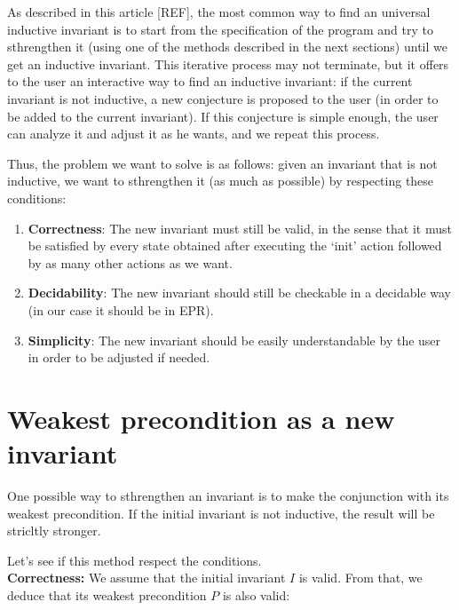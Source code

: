 \documentclass[11pt,a4paper,oldfontcommands]{memoir}
\begin{document}
    As described in this article [REF], the most common way to find an universal inductive invariant is to start from the specification of the program
    and try to sthrengthen it (using one of the methods described in the next sections) until we get an inductive invariant.
    This iterative process may not terminate, but it offers to the user an interactive way to find an inductive invariant:
    if the current invariant is not inductive, a new conjecture is proposed to the user (in order to be added to the current invariant).
    If this conjecture is simple enough, the user can analyze it and adjust it as he wants, and we repeat this process.

    Thus, the problem we want to solve is as follows:
    given an invariant that is not inductive, we want to sthrengthen it (as much as possible) by respecting these conditions:
    \begin{enumerate}
        \item \textbf{Correctness}: The new invariant must still be valid, in the sense that it must be satisfied by every state obtained
        after executing the `init' action followed by as many other actions as we want.
        \item \textbf{Decidability}: The new invariant should still be checkable in a decidable way (in our case it should be in EPR).
        \item \textbf{Simplicity}: The new invariant should be easily understandable by the user in order to be adjusted if needed.
    \end{enumerate}

    \section{Weakest precondition as a new invariant}

    One possible way to sthrengthen an invariant is to make the conjunction with its weakest precondition.
    If the initial invariant is not inductive, the result will be stricltly stronger.

    Let's see if this method respect the conditions.\\
    
    \textbf{Correctness:} We assume that the initial invariant \(I\) is valid. From that, we deduce that its weakest precondition \(P\) is also valid:
    \\
\end{document}
